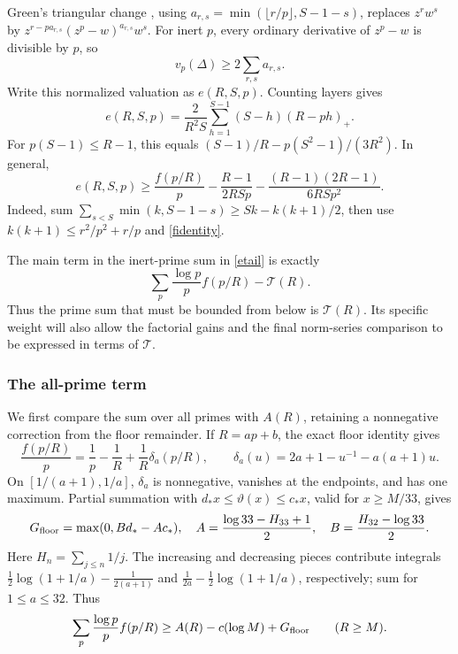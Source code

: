 \documentclass[11pt]{article}
\newcommand{\Tn}{\mathcal T}
\begin{document}
Green's triangular change \cite{green}, using
\(a_{r,s}=\min(\lfloor r/p\rfloor,S-1-s)\), replaces \(z^rw^s\) by
\(z^{r-pa_{r,s}}(z^p-w)^{a_{r,s}}w^s\). For inert \(p\), every
ordinary derivative of \(z^p-w\) is divisible by \(p\), so
\[
 v_p(\Delta)\ge2\sum_{r,s}a_{r,s}.
\]
Write this normalized valuation as \(e(R,S,p)\). Counting layers gives
\begin{equation}\label{elayers}
 e(R,S,p)=\frac2{R^2S}\sum_{h=1}^{S-1}(S-h)(R-ph)_+.
\end{equation}
For \(p(S-1)\le R-1\), this equals
\((S-1)/R-p(S^2-1)/(3R^2)\). In general,
\begin{equation}\label{etail}
 e(R,S,p)\ge\frac{f(p/R)}p
       -\frac{R-1}{2RSp}
       -\frac{(R-1)(2R-1)}{6RSp^2}.
\end{equation}
Indeed, sum
\(\sum_{s<S}\min(k,S-1-s)\ge Sk-k(k+1)/2\), then use
\(k(k+1)\le r^2/p^2+r/p\) and \eqref{fidentity}.

The main term in the inert-prime sum in \eqref{etail} is exactly
\[
 \sum_p\frac{\log p}{p}f(p/R)-\Tn(R).
\]
Thus the prime sum that must be bounded from below is \(\Tn(R)\).
Its specific weight will also allow the factorial gains and the final
norm-series comparison to be expressed in terms of \(\Tn\).

\subsubsection{The all-prime term}
We first compare the sum over all primes with \(A(R)\), retaining a
nonnegative correction from the floor remainder.
If \(R=ap+b\), the exact floor identity gives
\[
 \frac{f(p/R)}p=\frac1p-\frac1R+\frac1R\delta_a(p/R),\qquad
 \delta_a(u)=2a+1-u^{-1}-a(a+1)u.
\]
On \([1/(a+1),1/a]\), \(\delta_a\) is nonnegative, vanishes at
the endpoints, and has one maximum. Partial summation with
\(d_*x\le\vartheta(x)\le c_*x\), valid for \(x\ge M/33\), gives
\begin{equation}\label{Gfloor}
 G_{\rm floor}=\max(0,Bd_*-Ac_*),\quad
 A=\frac{\log33-H_{33}+1}{2},\quad
 B=\frac{H_{32}-\log33}{2}.
\end{equation}
Here \(H_n=\sum_{j\le n}1/j\). The increasing and decreasing pieces
contribute integrals
\(\frac12\log(1+1/a)-\frac1{2(a+1)}\) and
\(\frac1{2a}-\frac12\log(1+1/a)\), respectively; sum for
\(1\le a\le32\). Thus
\begin{equation}\label{allf}
 \sum_p\frac{\log p}{p}f(p/R)
 \ge A(R)-c(\log M)+G_{\rm floor}\qquad(R\ge M).
\end{equation}
\end{document}

